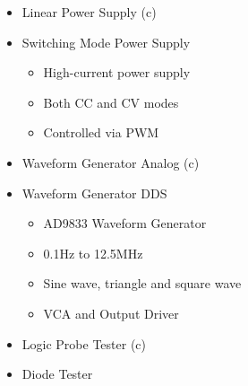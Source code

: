 \begin{itemize}
	\item Linear Power Supply (c)
	\item Switching Mode Power Supply
	\begin{itemize}
		\item High-current power supply
		\item Both CC and CV modes
		\item Controlled via PWM
	\end{itemize}
	\item Waveform Generator Analog (c)
	\item Waveform Generator DDS
	\begin{itemize}
		\item AD9833 Waveform Generator
		\item 0.1Hz to 12.5MHz
		\item Sine wave, triangle and square wave
		\item VCA and Output Driver
	\end{itemize}
	\item Logic Probe Tester (c)
	\item Diode Tester
	\begin{itemize}

\end{itemize}
\end{itemize}

